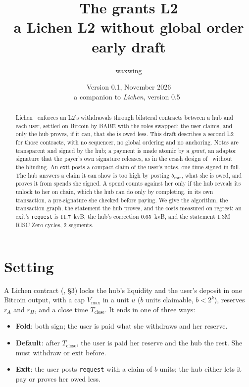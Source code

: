 \documentclass[11pt]{article}
\title{\textbf{The grants L2}\\a Lichen L2 without global order\\[2pt]\large early draft}
\author{waxwing}
\date{Version 0.1, November 2026\\[2pt]\small a companion to \emph{Lichen}, version 0.5~\cite{lichen}}
\newcommand{\vmax}{V_{\max}}
\newcommand{\Tc}{T_{\mathrm{close}}}
\newcommand{\bcorr}{b_{\mathrm{corr}}}
\newcommand{\tx}[1]{\texttt{#1}}
\begin{document}
\maketitle

\begin{abstract}
Lichen~\cite{lichen} enforces an L2's withdrawals through bilateral
contracts between a hub and each user, settled on Bitcoin by BABE with
the roles swapped: the user claims, and only the hub proves, if it can,
that she is owed less. This draft describes a second L2 for those
contracts, with no sequencer, no global ordering and no anchoring. Notes
are transparent and signed by the hub; a payment is made atomic by a
\emph{grant}, an adaptor signature that the payer's own signature
releases, as in the ecash design of~\cite{ecash} without the blinding.
An exit posts a compact claim of the user's notes, one-time signed in
full. The hub answers a claim it can show is too high by posting
$\bcorr$, what she is owed, and proves it from spends she signed. A
spend counts against her only if the hub reveals its unlock to her on
chain, which the hub can do only by completing, in its own transaction,
a pre-signature she checked before paying. We give the algorithm, the
transaction graph, the statement the hub proves, and the costs measured
on regtest: an exit's \tx{request} is 11.7~kvB, the hub's correction
0.65~kvB, and the statement 1.3M RISC Zero cycles, 2 segments.
\end{abstract}

\section{Setting}

A Lichen contract (\cite{lichen}, \S3) locks the hub's liquidity and the
user's deposit in one Bitcoin output, with a cap $\vmax$ in a unit $u$
($b$ units claimable, $b < 2^{k}$), reserves $r_A$ and $r_H$, and a
close time $\Tc$. It ends in one of three ways:
\begin{itemize}[nosep]
\item \textbf{Fold}: both sign; the user is paid what she withdraws and
  her reserve.
\item \textbf{Default}: after $\Tc$, the user is paid her reserve and the
  hub the rest. She must withdraw or exit before.
\item \textbf{Exit}: the user posts \tx{request} with a claim of $b$
  units; the hub either lets it pay or proves her owed less.
\end{itemize}
\end{document}
